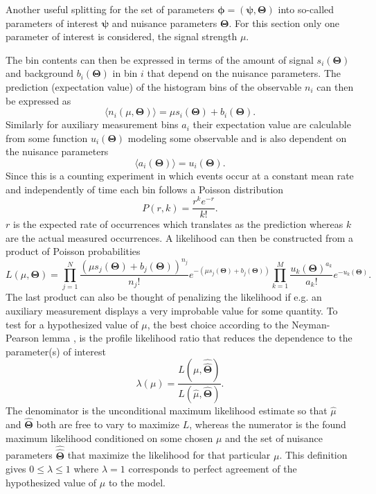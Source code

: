 Another useful splitting for the set of parameters $\bm{\phi}=(\bm{\psi},\bm{\Theta})$ into so-called parameters of interest $\bm{\psi}$ and nuisance parameters $\bm{\Theta}$. For this section only one parameter of interest is considered, the signal strength $\mu$.

The bin contents can then be expressed in terms of the amount of signal $s_i(\bm{\Theta})$ and background $b_i(\bm{\Theta})$ in bin $i$ that depend on the nuisance parameters. The prediction (expectation value) of the histogram bins of the observable $n_i$ can then be expressed as
\begin{equation} \label{eq:n_i}
    \langle n_i(\mu,\bm{\Theta})\rangle = \mu s_i(\bm{\Theta}) +b_i(\bm{\Theta}).
\end{equation}
Similarly for auxiliary measurement bins $a_i$ their expectation value are calculable from some function $u_i(\bm{\Theta})$ modeling some observable and is also dependent on the nuisance parameters
\begin{equation} \label{eq:a_i}
    \langle a_i(\bm{\Theta}) \rangle = u_i(\bm{\Theta}).
\end{equation}
Since this is a counting experiment in which events occur at a constant mean rate and independently of time each bin follows a Poisson distribution
\begin{equation}\label{eq:poisson}
    P(r,k)=\frac{r^k e^{-r}}{k!}.
\end{equation}
$r$ is the expected rate of occurrences which translates as the prediction whereas $k$ are the actual measured occurrences. A likelihood can then be constructed from a product of Poisson probabilities
\begin{equation}\label{eq:likelihood}
    L(\mu,\bm{\Theta})=
    \prod_{j=1}^N \frac{(\mu s_j(\bm{\Theta}) + b_j(\bm{\Theta}))^{n_j}}{n_j !} e^{-(\mu s_j(\bm{\Theta}) + b_j(\bm{\Theta}))}
    \prod_{k=1}^M \frac{u_k(\bm{\Theta})^{a_k}}{a_k!} e^{-u_k(\bm{\Theta})}.
\end{equation}
The last product can also be thought of penalizing the likelihood if e.g. an auxiliary measurement displays a very improbable value for some quantity. To test for a hypothesized value of $\mu$, the best choice according to the Neyman-Pearson lemma \citep{behnke2013data}, is the profile likelihood ratio that reduces the dependence to the parameter(s) of interest
\begin{equation}\label{eq:likelihood_ratio}
    \lambda(\mu)=
    \frac{L(\mu,\hat{\hat{\bm{\Theta}}})}
    {L(\hat{\mu},\hat{\bm{\Theta}})}.
\end{equation}
The denominator is the unconditional maximum likelihood estimate so that $\hat{\mu}$ and $\hat{\bm{\Theta}}$ both are free to vary to maximize $L$, whereas the numerator is the found maximum likelihood conditioned on some chosen $\mu$ and the set of nuisance parameters $\hat{\hat{\bm{\Theta}}}$ that maximize the likelihood for that particular $\mu$. This definition gives $0 \leq \lambda \leq 1$ where $\lambda = 1$ corresponds to perfect agreement of the hypothesized value of $\mu$ to the model.

